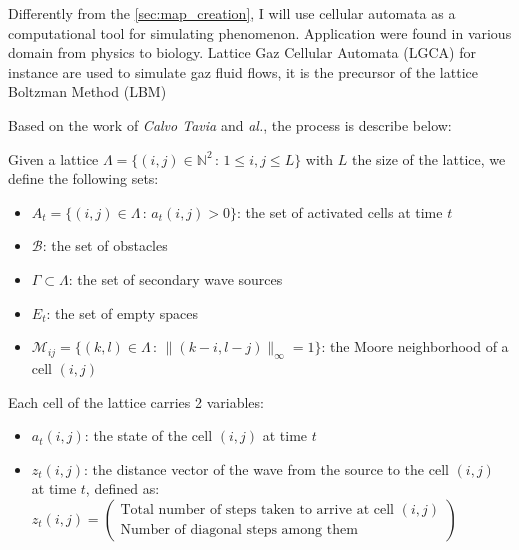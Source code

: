 \documentclass[../main.tex]{subfiles}
\begin{document}
\vspace{1em}

Differently from the \autoref{sec:map_creation}, I will use cellular automata as a computational tool for simulating phenomenon. Application were found in various domain from physics to biology. Lattice Gaz Cellular Automata (LGCA) for instance are used to simulate gaz fluid flows, it is the precursor of the lattice Boltzman Method (LBM)\cite{chen_1998}

\vspace{1em}

Based on the work of \textit{Calvo Tavia} and \textit{al.}\cite{tapia_2016}, the process is describe below:

\vspace{1em}

Given a lattice $\Lambda = \{(i,j) \in \mathbb{N}^{2} \,:\, 1 \leq i, j \leq L\}$ with $L$ the size of the lattice, we define the following sets:
\vspace{1em}

\begin{itemize}
	\item $A_t = \{ (i, j) \in \Lambda \,:\, a_t(i, j) > 0\}$: the set of activated cells at time $t$
	\item $\mathcal{B}$: the set of obstacles
	\item $\Gamma \subset \Lambda$: the set of secondary wave sources
	\item $E_t$: the set of empty spaces
	\item $\mathcal{M}_{ij} = \{ (k, l) \in \Lambda \,:\, \|(k - i, l - j)\|_{\infty} = 1\}$: the Moore neighborhood of a cell $(i, j)$
\end{itemize}

\vspace{1em}

Each cell of the lattice carries 2 variables:
\begin{itemize}
	\item $a_t (i, j)$: the state of the cell $(i, j)$ at time $t$
	\item $z_t (i, j)$: the distance vector of the wave from the source to the cell $(i, j)$ at time $t$, defined as:
	$z_t (i, j) = \begin{pmatrix}
		\text{Total number of steps taken to arrive at cell } (i, j) \\
		\text{Number of diagonal steps among them}
	\end{pmatrix}$
\end{itemize}
\end{document}
